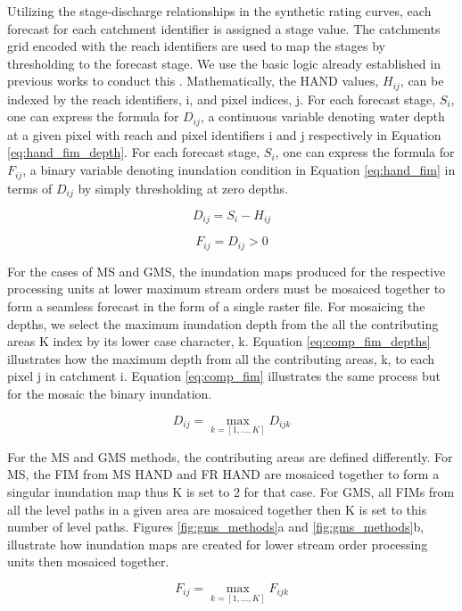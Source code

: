 Utilizing the stage-discharge relationships in the synthetic rating curves, each forecast for each catchment identifier is assigned a stage value. 
The catchments grid encoded with the reach identifiers are used to map the stages by thresholding to the forecast stage.
We use the basic logic already established in previous works to conduct this \cite{nobre2016hand,liu2016cybergis,maidment2017conceptual}.
Mathematically, the HAND values, $H_{ij}$, can be indexed by the reach identifiers, i, and pixel indices, j.
For each forecast stage, $S_i$, one can express the formula for $D_{ij}$, a continuous variable denoting water depth at a given pixel with reach and pixel identifiers i and j respectively in Equation \ref{eq:hand_fim_depth}.
For each forecast stage, $S_i$, one can express the formula for $F_{ij}$, a binary variable denoting inundation condition in Equation \ref{eq:hand_fim} in terms of $D_{ij}$ by simply thresholding at zero depths.
%
\begin{linenomath*}
\begin{equation}
\label{eq:hand_fim_depth}
    D_{ij} = S_i - H_{ij}
\end{equation}
\end{linenomath*}
%
\begin{linenomath*}
\begin{equation}
\label{eq:hand_fim}
    F_{ij} = D_{ij} > 0
\end{equation}
\end{linenomath*}
%
For the cases of MS and GMS, the inundation maps produced for the respective processing units at lower maximum stream orders must be mosaiced together to form a seamless forecast in the form of a single raster file.
For mosaicing the depths, we select the maximum inundation depth from the all the contributing areas K index by its lower case character, k.
Equation \ref{eq:comp_fim_depths} illustrates how the maximum depth from all the contributing areas, k, to each pixel j in catchment i.
Equation \ref{eq:comp_fim} illustrates the same process but for the mosaic the binary inundation.
%
\begin{linenomath*}
\begin{equation}
\label{eq:comp_fim_depths}
    D_{ij} = \max_{k=[1,...,K]} D_{ijk}
\end{equation}
\end{linenomath*}
%
For the MS and GMS methods, the contributing areas are defined differently.
For MS, the FIM from MS HAND and FR HAND are mosaiced together to form a singular inundation map thus K is set to 2 for that case.
For GMS, all FIMs from all the level paths in a given area are mosaiced together then K is set to this number of level paths.
Figures \ref{fig:gms_methods}a and \ref{fig:gms_methods}b, illustrate how inundation maps are created for lower stream order processing units then mosaiced together.
%
\begin{linenomath*}
\begin{equation}
\label{eq:comp_fim}
    F_{ij} = \max_{k=[1,...,K]} F_{ijk}
\end{equation}
\end{linenomath*}
%
